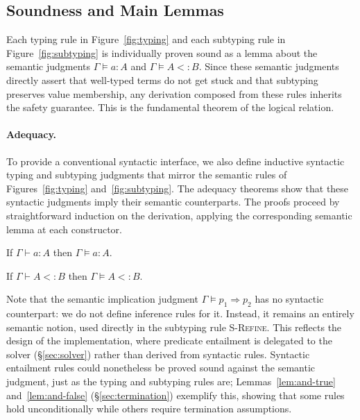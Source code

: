\documentclass[acmsmall]{acmart}
\begin{document}




\subsection{Soundness and Main Lemmas}\label{sec:soundness}

Each typing rule in Figure~\ref{fig:typing} and each subtyping rule in Figure~\ref{fig:subtyping} is individually proven sound as a lemma about the semantic judgments $\Gamma \vDash a : A$ and $\Gamma \vDash A <: B$. Since these semantic judgments directly assert that well-typed terms do not get stuck and that subtyping preserves value membership, any derivation composed from these rules inherits the safety guarantee. This is the fundamental theorem of the logical relation.

\paragraph{Adequacy.}
To provide a conventional syntactic interface, we also define inductive syntactic typing and subtyping judgments that mirror the semantic rules of Figures~\ref{fig:typing} and~\ref{fig:subtyping}. The adequacy theorems show that these syntactic judgments imply their semantic counterparts. The proofs proceed by straightforward induction on the derivation, applying the corresponding semantic lemma at each constructor.

\begin{theorem}\label{thm:adequacy-typing}
  If\/ $\Gamma \vdash a : A$ then $\Gamma \vDash a : A$.
\end{theorem}

\begin{theorem}\label{thm:adequacy-subtyping}
  If\/ $\Gamma \vdash A <: B$ then $\Gamma \vDash A <: B$.
\end{theorem}

\noindent Note that the semantic implication judgment $\Gamma \vDash p_1 \Rightarrow p_2$ has no syntactic counterpart: we do not define inference rules for it. Instead, it remains an entirely semantic notion, used directly in the subtyping rule \textsc{S-Refine}. This reflects the design of the implementation, where predicate entailment is delegated to the solver (\S\ref{sec:solver}) rather than derived from syntactic rules. Syntactic entailment rules could nonetheless be proved sound against the semantic judgment, just as the typing and subtyping rules are; Lemmas~\ref{lem:and-true} and~\ref{lem:and-false} (\S\ref{sec:termination}) exemplify this, showing that some rules hold unconditionally while others require termination assumptions.
\end{document}
